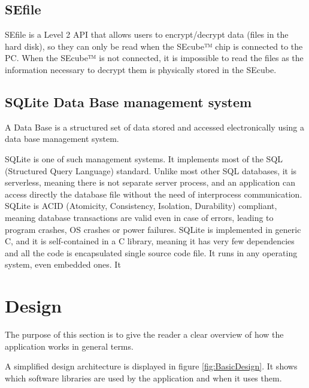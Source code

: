\subsection{SEfile} 
SEfile \cite{SEcubeRes} is a Level 2 API that allows users to encrypt/decrypt data (files in the hard disk), so they can only be read when the SEcube™ chip is connected to the PC. When the SEcube™ is not connected, it is impossible to read the files as the information necessary to decrypt them is physically stored in the SEcube.

\subsection{SQLite Data Base management system}
A Data Base is a structured set of data stored and accessed electronically using a data base management system. 

SQLite \cite{SQLite} is one of such management systems. It implements most of the SQL (Structured Query Language) standard. Unlike most other SQL databases, it is serverless, meaning there is not separate server process, and an application can access directly the database file without the need of interprocess communication. SQLite is ACID (Atomicity, Consistency, Isolation, Durability) compliant, meaning database transactions are valid even in case of errors, leading to program crashes, OS crashes or power failures. SQLite is implemented in generic C, and it is self-contained in a C library, meaning it has very few dependencies and all the code is encapsulated single source code file. It runs in any operating system, even embedded ones. It 


\section{Design}

The purpose of this section is to give the reader a clear overview of how the application works in general terms. 

A simplified design architecture is displayed in figure \ref{fig:BasicDesign}. It shows which software libraries are used by the application and when it uses them.


